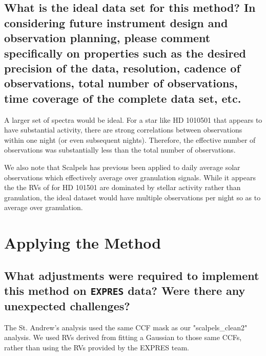 \documentclass[12pt]{article}
\begin{document}
\subsection{What is the ideal data set for this method?  In considering future instrument design and observation planning, please comment specifically on properties such as the desired precision of the data, resolution, cadence of observations, total number of observations, time coverage of the complete data set, etc.}

A larger set of spectra would be ideal.  For a star like HD 1010501 that appears to have substantial activity, there are strong correlations between observations within one night (or even subsequent nights).  Therefore, the effective number of observations was substantially less than the total number of observations.

We also note that Scalpels has previous been applied to daily average solar observations which effectively average over granulation signals.  While it appears the the RVs of for HD 101501 are dominated by stellar activity rather than granulation, the ideal dataset would have multiple observations per night so as to average over granulation.





\section{Applying the Method}
\subsection{What adjustments were required to implement this method on \texttt{EXPRES} data?  Were there any unexpected challenges?}

The St. Andrew's analysis used the same CCF mask as our "scalpels_clean2" analysis.
We used RVs derived from fitting a Gaussian to those same CCFs, rather than using the RVs provided by the EXPRES team.
\end{document}
